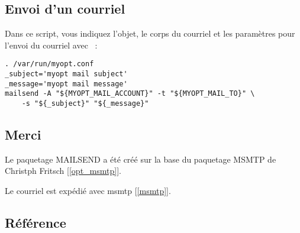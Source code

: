 \subsection{Envoi d'un courriel}
	Dans ce script, vous indiquez l'objet, le corps du courriel et les paramètres
	pour l'envoi du courriel avec ~:

\begin{verbatim}
. /var/run/myopt.conf
_subject='myopt mail subject'
_message='myopt mail message'
mailsend -A "${MYOPT_MAIL_ACCOUNT}" -t "${MYOPT_MAIL_TO}" \
    -s "${_subject}" "${_message}"
\end{verbatim}


\subsection{Merci}

  Le paquetage MAILSEND a été créé sur la base du paquetage MSMTP
  de Christph Fritsch {[\ref{opt_msmtp}]}.

  Le courriel est expédié avec msmtp {[\ref{msmtp}]}.

\subsection{Référence}

\begin{list}{\textbf{[]}}{}

  \item \label{opt_msmtp}

  \item \label{msmtp}

    \item \label{rfc5322}
\end{list}

